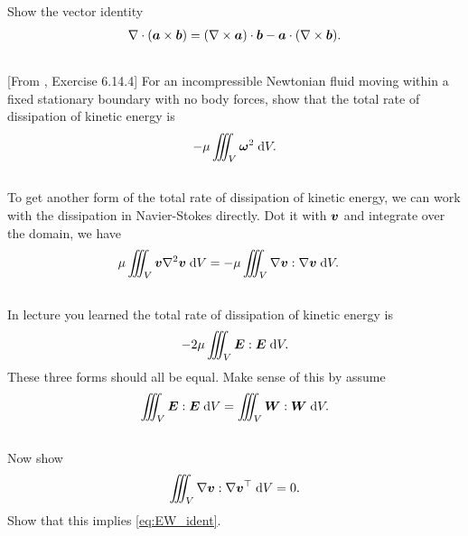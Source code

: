 \documentclass[11pt,letterpaper]{report}
\begin{document}
\subsection{}
Show the vector identity
\begin{align}
    \nabla\cdot(\boldsymbol{a}\times\boldsymbol{b}) = (\nabla\times\boldsymbol{a})\cdot\boldsymbol{b}-\boldsymbol{a}\cdot(\nabla\times\boldsymbol{b}).
\end{align}

\subsection{}
[From \cite{Aris_62}, Exercise 6.14.4] For an incompressible Newtonian fluid moving within a fixed stationary boundary with no body forces, show that the total rate of dissipation of kinetic energy is
\begin{align}
    -\mu \iiint_V \boldsymbol{\omega}^2 \;\mathrm{d} V.
\end{align}

\subsection{}
To get another form of the total rate of dissipation of kinetic energy, we can work with the dissipation in Navier-Stokes directly. Dot it with $\boldsymbol{v}$ and integrate over the domain, we have
\begin{align}
    \mu \iiint_V \boldsymbol{v}\nabla^2\boldsymbol{v} \;\mathrm{d} V &= -\mu \iiint_V \nabla \boldsymbol{v}:\nabla\boldsymbol{v} \;\mathrm{d} V.
\end{align}

\subsection{}
In lecture you learned the total rate of dissipation of kinetic energy is
\begin{align}
    -2\mu \iiint_V \boldsymbol{E}:\boldsymbol{E} \;\mathrm{d} V.
\end{align}
These three forms should all be equal. Make sense of this by assume 
\begin{align}
    \iiint_V \boldsymbol{E}:\boldsymbol{E} \;\mathrm{d} V = \iiint_V \boldsymbol{W}:\boldsymbol{W} \;\mathrm{d} V.\label{eq:EW_ident}
\end{align}

\subsection{}
Now show
\begin{align}
    \iiint_V \nabla \boldsymbol{v}:\nabla\boldsymbol{v}^\top \;\mathrm{d} V = 0.
\end{align}
Show that this implies \eqref{eq:EW_ident}.
\end{document}
